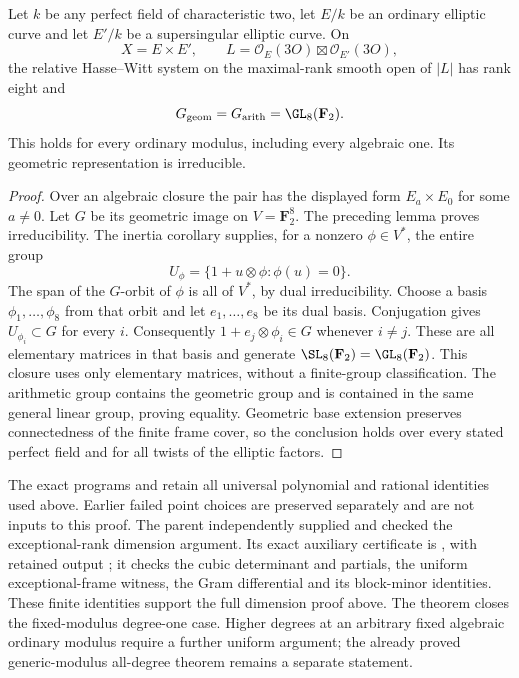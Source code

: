 \begin{theorem}
\label{thm:mixed-every-fixed-modulus-degree-one-candidate}
Let $k$ be any perfect field of characteristic two, let $E/k$
be an ordinary elliptic curve and let $E'/k$ be a supersingular
elliptic curve. On
\[
 X=E\times E',\qquad
 L=\mathcal O_E(3O)\boxtimes\mathcal O_{E'}(3O),
\]
the relative Hasse--Witt system on the maximal-rank smooth
open of $|L|$ has rank eight and
\[
                         G_{\mathrm{geom}}=G_{\mathrm{arith}}
                              =\GL_8(\mathbf F_2).
\]
This holds for every ordinary modulus, including every algebraic
one. Its geometric representation is irreducible.
\end{theorem}
\begin{proof}
Over an algebraic closure the pair has the displayed form
$E_a\times E_0$ for some $a\ne0$. Let $G$ be its geometric
image on $V=\mathbf F_2^8$. The preceding lemma proves
irreducibility. The inertia corollary supplies, for a nonzero
$\phi\in V^*$, the entire group
\[
                  U_\phi=\{1+u\otimes\phi:\phi(u)=0\}.
\]
The span of the $G$-orbit of $\phi$ is all of $V^*$, by dual
irreducibility. Choose a basis $\phi_1,\ldots,\phi_8$ from
that orbit and let $e_1,\ldots,e_8$ be its dual basis.
Conjugation gives $U_{\phi_i}\subset G$ for every $i$.
Consequently $1+e_j\otimes\phi_i\in G$ whenever $i\ne j$.
These are all elementary matrices in that basis and generate
$\SL_8(\mathbf F_2)=\GL_8(\mathbf F_2)$. This closure uses
only elementary matrices, without a finite-group classification.
The arithmetic group contains the geometric group and is
contained in the same general linear group, proving equality.
Geometric base extension preserves connectedness of the finite
frame cover, so the conclusion holds over every stated perfect
field and for all twists of the elliptic factors.
\end{proof}

\begin{remark}
\label{rem:mixed-uniform-inertia-scope-candidate}
The exact programs
and
retain all universal polynomial and rational identities used above.
Earlier failed point choices are preserved separately and are not
inputs to this proof. The parent independently supplied and checked
the exceptional-rank dimension argument. Its exact auxiliary certificate is
, with retained output
; it checks the
cubic determinant and partials, the uniform exceptional-frame witness,
the Gram differential and its block-minor identities. These finite
identities support the full dimension proof above.
The theorem closes the fixed-modulus degree-one case. Higher degrees
at an arbitrary fixed algebraic ordinary modulus require a further
uniform argument; the already proved generic-modulus all-degree
theorem remains a separate statement.
\end{remark}
